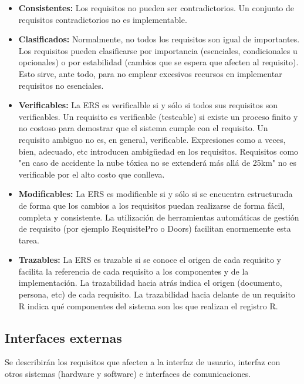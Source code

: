 \documentclass[12pt,a4paper, twosite]{article}
\begin{document}
\begin{itemize}
\begin{itemize}
			\item \textbf{Consistentes:} Los requisitos no pueden ser contradictorios. Un
			conjunto de requisitos contradictorios no es implementable.
			
			\item \textbf{Clasificados:} Normalmente, no todos los requisitos son igual de
			importantes. Los requisitos pueden clasificarse por importancia
			(esenciales, condicionales u opcionales) o por estabilidad (cambios
			que se espera que afecten al requisito). Esto sirve, ante todo,
			para no emplear excesivos recursos en implementar requisitos no
			esenciales.
			
			\item \textbf{Verificables:} La ERS es verificalble si y sólo si todos sus
			requisitos son verificables. Un requisito es verificable
			(testeable) si existe un proceso finito y no costoso para
			demostrar que el sistema cumple con el requisito. Un requisito
			ambiguo no es, en general, verificable. Expresiones como a veces,
			bien, adecuado, etc introducen ambigüedad en los
			requisitos. Requisitos como "en caso de accidente la nube tóxica
			no se extenderá más allá de 25km" no es verificable por el alto
			costo que conlleva.
			
			\item \textbf{Modificables:} La ERS es modificable si y sólo si se encuentra
			estructurada de forma que los cambios a los requisitos puedan
			realizarse de forma fácil, completa y consistente. La utilización
			de herramientas automáticas de gestión de requisito (por ejemplo
			RequisitePro o Doors) facilitan enormemente esta tarea.
			
			\item \textbf{Trazables:} La ERS es trazable si se conoce el origen de cada
			requisito y facilita la referencia de cada requisito a los
			componentes y de la implementación. La trazabilidad hacia atrás
			indica el origen (documento, persona, etc) de cada requisito. La
			trazabilidad hacia delante de un requisito R indica qué
			componentes del sistema son los que realizan el registro R.
		\end{itemize}
	\end{itemize}
	
	
	\subsection{Interfaces externas}
	\label{sec:orgfd5391f}
	
	Se describirán los requisitos que afecten a la interfaz de usuario,
	interfaz con otros sistemas (hardware y software) e interfaces de comunicaciones.
	
\end{document}
